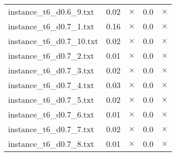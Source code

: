 \documentclass{article}
\begin{document}
\begin{center}
\begin{tabular}{lrrrr}
instance\_t6\_d0.6\_9.txt & 0.02 & 
$\times$
 & 0.0 & 
$\times$
\\
instance\_t6\_d0.7\_1.txt & 0.16 & 
$\times$
 & 0.0 & 
$\times$
\\
instance\_t6\_d0.7\_10.txt & 0.02 & 
$\times$
 & 0.0 & 
$\times$
\\
instance\_t6\_d0.7\_2.txt & 0.01 & 
$\times$
 & 0.0 & 
$\times$
\\
instance\_t6\_d0.7\_3.txt & 0.02 & 
$\times$
 & 0.0 & 
$\times$
\\
instance\_t6\_d0.7\_4.txt & 0.03 & 
$\times$
 & 0.0 & 
$\times$
\\
instance\_t6\_d0.7\_5.txt & 0.02 & 
$\times$
 & 0.0 & 
$\times$
\\
instance\_t6\_d0.7\_6.txt & 0.01 & 
$\times$
 & 0.0 & 
$\times$
\\
instance\_t6\_d0.7\_7.txt & 0.02 & 
$\times$
 & 0.0 & 
$\times$
\\
instance\_t6\_d0.7\_8.txt & 0.01 & 
$\times$
 & 0.0 & 
$\times$
\\
\hline\end{tabular}
\end{center}
\end{document}
